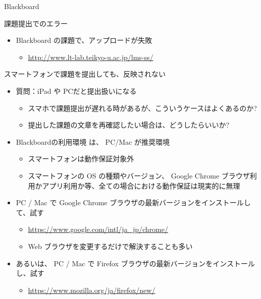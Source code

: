 \documentclass[a4j,10pt]{jsarticle}
\begin{document}
{\begin{frame}[label={sec:orgc119bb0},fragile]{Blackboard}
\begin{block}{課題提出でのエラー}
\begin{itemize}
\begin{itemize}
\item 内容を見たら、すべて白紙の状態で提出となってしまっていた
\end{itemize}
\par
\item Blackboard の課題で、アップロードが失敗
\begin{itemize}
\item \url{http://www.lt-lab.teikyo-u.ac.jp/lms-ss/}
\end{itemize}
\end{itemize}
\end{block}
\par
\begin{block}{スマートフォンで課題を提出しても、反映されない}
\begin{itemize}
\item 質問：iPad や PCだと提出扱いになる
\begin{itemize}
\item スマホで課題提出が遅れる時があるが、こういうケースはよくあるのか?
\item 提出した課題の文章を再確認したい場合は、どうしたらいいか?
\end{itemize}
\par
\item Blackboardの利用環境 は、 \alert{PC/Mac が推奨環境}
\begin{itemize}
\item スマートフォンは動作保証対象外
\item スマートフォンの OS の種類やバージョン、 Google Chrome ブラウザ利用かアプリ利用か等、全ての場合における動作保証は現実的に無理
\end{itemize}
\par
\item PC / Mac で Google Chrome ブラウザの最新バージョンをインストールして、試す
\begin{itemize}
\item \url{https://www.google.com/intl/ja\_jp/chrome/}
\item Web ブラウザを変更するだけで解決することも多い
\end{itemize}
\par
\item あるいは、 PC / Mac で Firefox ブラウザの最新バージョンをインストールし、試す
\begin{itemize}
\item \url{https://www.mozilla.org/ja/firefox/new/}
\end{itemize}
\end{itemize}
\par
\begin{verbatim}


\end{verbatim}
\end{block}
\end{frame}}
\end{document}
